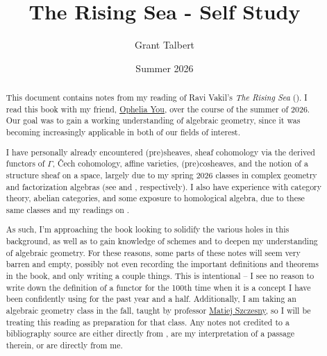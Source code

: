 \documentclass[A4, 11pt]{report}
\title{The Rising Sea - Self Study}
\date{Summer 2026}
\author{Grant Talbert}
\begin{document}
	\maketitle

	\begin{abstract}
		This document contains notes from my reading of Ravi Vakil's \emph{The Rising Sea} (\cite{vakil}). I read this book with my friend, \href{https://sites.google.com/view/xcyou/about?authuser=0}{Ophelia You}, over the course of the summer of 2026. Our goal was to gain a working understanding of algebraic geometry, since it was becoming increasingly applicable in both of our fields of interest.

		I have personally already encountered (pre)sheaves, sheaf cohomology via the derived functors of $\Gamma$, \v{C}ech cohomology, affine varieties, (pre)cosheaves, and the notion of a structure sheaf on a space, largely due to my spring 2026 classes in complex geometry and factorization algebras (see \cite{cm} and \cite{fa}, respectively). I also have experience with category theory, abelian categories, and some exposure to homological algebra, due to these same classes and my readings on \cite{ml,htt,hovey,cathtpy,aluffi,weibel}.

		As such, I'm approaching the book looking to solidify the various holes in this background, as well as to gain knowledge of schemes and to deepen my understanding of algebraic geometry. For these reasons, some parts of these notes will seem very barren and empty, possibly not even recording the important definitions and theorems in the book, and only writing a couple things. This is intentional -- I see no reason to write down the definition of a functor for the 100th time when it is a concept I have been confidently using for the past year and a half. Additionally, I am taking an algebraic geometry class in the fall, taught by professor \href{https://math.bu.edu/people/szczesny/}{Matiej Szczesny}, so I will be treating this reading as preparation for that class. Any notes not credited to a bibliography source are either directly from \cite{vakil}, are my interpretation of a passage therein, or are directly from me.
	\end{abstract}
	
	\tableofcontents


	
	


	
	
\end{document}
